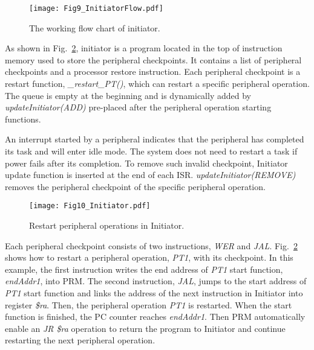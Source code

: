 %
\begin{figure}[t]
    \centering
    \texttt{[image: Fig9\_InitiatorFlow.pdf]}
    \caption{The working flow chart of initiator.}
    \label{fig:InitiatorFlow}
\end{figure}

As shown in Fig.~\ref{fig:Initiator}, initiator is a program located in the top of instruction memory used to store the peripheral checkpoints.
It contains a list of peripheral checkpoints and a processor restore instruction.
Each peripheral checkpoint is a restart function, \emph{\_restart\_PT()}, which can restart a specific peripheral operation.
The queue is empty at the beginning and is dynamically added by \emph{updateInitiator(ADD)} pre-placed after the peripheral operation starting functions.

%
An interrupt started by a peripheral indicates that the peripheral has completed its task and will enter idle mode.
The system does not need to restart a task if power fails after its completion.
To remove such invalid checkpoint, Initiator update function is inserted at the end of each ISR.
\emph{updateInitiator(REMOVE)} removes the peripheral checkpoint of the specific peripheral operation.

%
\begin{figure}[t]
    \centering
    \texttt{[image: Fig10\_Initiator.pdf]}
    \caption{Restart peripheral operations in Initiator.}
    \label{fig:Initiator}
\end{figure}

Each peripheral checkpoint consists of two instructions, \emph{WER} and \emph{JAL}.
Fig.~\ref{fig:Initiator} shows how to restart a peripheral operation, \emph{PT1}, with its checkpoint.
In this example, the first instruction writes the end address of \emph{PT1} start function, \emph{endAddr1}, into PRM.
The second instruction, \emph{JAL}, jumps to the start address of \emph{PT1} start function and links the address of the next instruction in Initiator into register \emph{\$ra}.
Then, the peripheral operation \emph{PT1} is restarted.
When the start function is finished, the PC counter reaches \emph{endAddr1}.
Then PRM automatically enable an \emph{JR \$ra} operation to return the program to Initiator and continue restarting the next peripheral operation.

